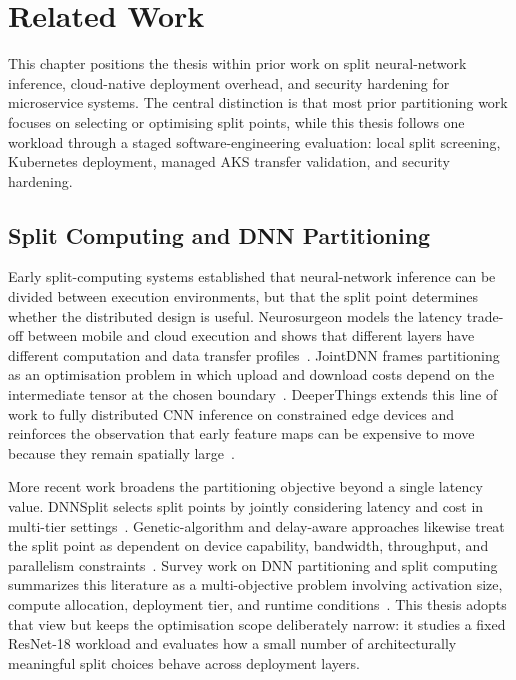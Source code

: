 \chapter{Related Work}\label{ch:related}

This chapter positions the thesis within prior work on split neural-network inference,
cloud-native deployment overhead, and security hardening for microservice systems. The
central distinction is that most prior partitioning work focuses on selecting or
optimising split points, while this thesis follows one workload through a staged
software-engineering evaluation: local split screening, Kubernetes deployment, managed
AKS transfer validation, and security hardening.

\section{Split Computing and DNN Partitioning}
\label{sec:rw-split-computing}

Early split-computing systems established that neural-network inference can be divided
between execution environments, but that the split point determines whether the
distributed design is useful. Neurosurgeon models the latency trade-off between mobile
and cloud execution and shows that different layers have different computation and data
transfer profiles~\cite{neurosurgeon}. JointDNN frames partitioning as an optimisation
problem in which upload and download costs depend on the intermediate tensor at the
chosen boundary~\cite{jointdnn}. DeeperThings extends this line of work to fully
distributed CNN inference on constrained edge devices and reinforces the observation
that early feature maps can be expensive to move because they remain spatially
large~\cite{deeperthings}.

More recent work broadens the partitioning objective beyond a single latency value.
DNNSplit selects split points by jointly considering latency and cost in multi-tier
settings~\cite{dnnsplit}. Genetic-algorithm and delay-aware approaches likewise treat
the split point as dependent on device capability, bandwidth, throughput, and parallelism
constraints~\cite{ga_partitioning,delay_aware_inference}. Survey work on DNN
partitioning and split computing summarizes this literature as a multi-objective problem
involving activation size, compute allocation, deployment tier, and runtime
conditions~\cite{survey_partitioning}. This thesis adopts that view but keeps the
optimisation scope deliberately narrow: it studies a fixed ResNet-18 workload and
evaluates how a small number of architecturally meaningful split choices behave across
deployment layers.

